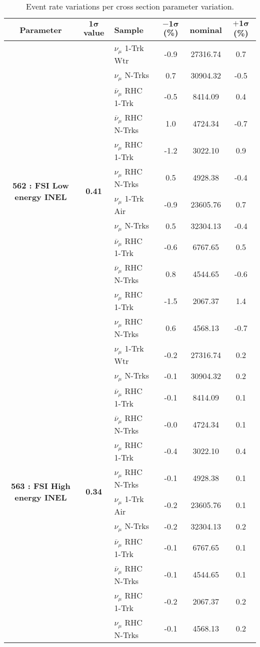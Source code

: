 \begin{table}[ht!]
\centering
\begin{tabular}{ c  c  l  c  c  c }
\midrule[1.3pt]
\textbf{Parameter} & \textbf{$\mathbf{1\sigma}$ value} & \textbf{Sample} & \textbf{$\mathbf{-1\sigma}$ (\%)}  &  \textbf{nominal}  &  \textbf{$\mathbf{+1\sigma}$ (\%)} \\
\midrule[1.3pt]
\multirow{12}{*}{\textbf{562 : FSI Low energy INEL}} & \multirow{12}{*}{\textbf{0.41}} & $\nu_\mu$ 1-Trk Wtr &   -0.9 &  27316.74 &   0.7 \\ 
 &  & $\nu_\mu$ N-Trks &   0.7 &  30904.32 &   -0.5 \\ 
 &  & $\overline{\nu}_\mu$ RHC 1-Trk &   -0.5 &  8414.09 &   0.4 \\ 
 &  & $\overline{\nu}_\mu$ RHC N-Trks &   1.0 &  4724.34 &   -0.7 \\ 
 &  & $\nu_\mu$ RHC 1-Trk &   -1.2 &  3022.10 &   0.9 \\ 
 &  & $\nu_\mu$ RHC N-Trks &   0.5 &  4928.38 &   -0.4 \\ 
 &  & $\nu_\mu$ 1-Trk Air &   -0.9 &  23605.76 &   0.7 \\ 
 &  & $\nu_\mu$ N-Trks &   0.5 &  32304.13 &   -0.4 \\ 
 &  & $\overline{\nu}_\mu$ RHC 1-Trk &   -0.6 &  6767.65 &   0.5 \\ 
 &  & $\overline{\nu}_\mu$ RHC N-Trks &   0.8 &  4544.65 &   -0.6 \\ 
 &  & $\nu_\mu$ RHC 1-Trk &   -1.5 &  2067.37 &   1.4 \\ 
 &  & $\nu_\mu$ RHC N-Trks &   0.6 &  4568.13 &   -0.7 \\ 
\midrule[1.3pt]
\multirow{12}{*}{\textbf{563 : FSI High energy INEL}} & \multirow{12}{*}{\textbf{0.34}} & $\nu_\mu$ 1-Trk Wtr &   -0.2 &  27316.74 &   0.2 \\ 
 &  & $\nu_\mu$ N-Trks &   -0.1 &  30904.32 &   0.2 \\ 
 &  & $\overline{\nu}_\mu$ RHC 1-Trk &   -0.1 &  8414.09 &   0.1 \\ 
 &  & $\overline{\nu}_\mu$ RHC N-Trks &   -0.0 &  4724.34 &   0.1 \\ 
 &  & $\nu_\mu$ RHC 1-Trk &   -0.4 &  3022.10 &   0.4 \\ 
 &  & $\nu_\mu$ RHC N-Trks &   -0.1 &  4928.38 &   0.1 \\ 
 &  & $\nu_\mu$ 1-Trk Air &   -0.2 &  23605.76 &   0.1 \\ 
 &  & $\nu_\mu$ N-Trks &   -0.2 &  32304.13 &   0.2 \\ 
 &  & $\overline{\nu}_\mu$ RHC 1-Trk &   -0.1 &  6767.65 &   0.1 \\ 
 &  & $\overline{\nu}_\mu$ RHC N-Trks &   -0.1 &  4544.65 &   0.1 \\ 
 &  & $\nu_\mu$ RHC 1-Trk &   -0.2 &  2067.37 &   0.2 \\ 
 &  & $\nu_\mu$ RHC N-Trks &   -0.1 &  4568.13 &   0.2 \\ 
\midrule[1.3pt]
\end{tabular}
\centering
\caption[Event Rate Variations Per Cross Section Parameter Variation]{Event rate variations per cross section parameter variation.}
\end{table}
